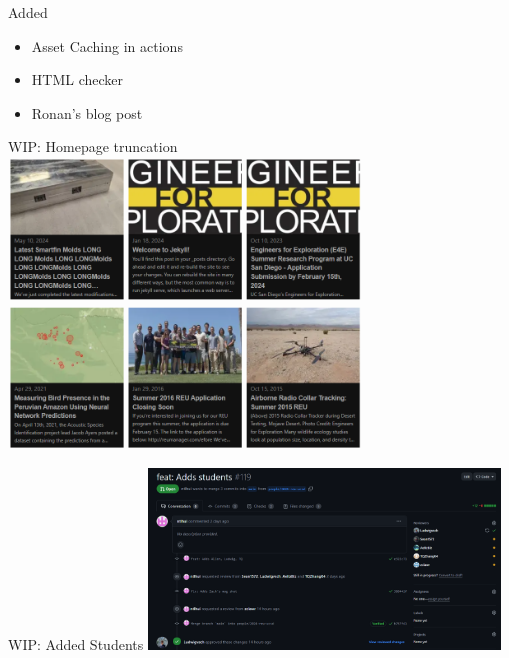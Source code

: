 \begin{frame}{Added}
    \begin{itemize}
        \item Asset Caching in actions
        \item HTML checker
        \item Ronan's blog post
    \end{itemize}
\end{frame}

\begin{frame}{WIP: Homepage truncation}
    \centering
    \includegraphics[height=0.7\textheight,width=0.7\textwidth,keepaspectratio]{./images/homepage.png}
\end{frame}

\begin{frame}{WIP: Added Students}
    \centering
    \includegraphics[height=0.7\textheight,width=0.7\textwidth,keepaspectratio]{./images/students.png}
\end{frame}






